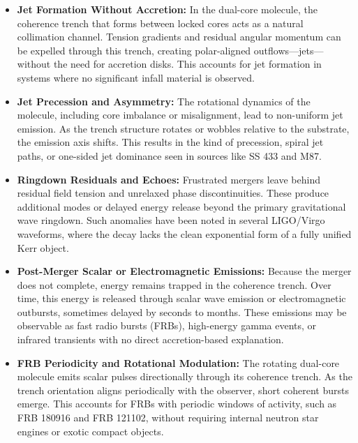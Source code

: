 \documentclass[sn-mathphys]{sn-jnl}
\theoremstyle{thmstyleone}%
\theoremstyle{thmstyletwo}%
\theoremstyle{thmstylethree}%
\begin{document}
\begin{itemize}
\item \textbf{Jet Formation Without Accretion:}  
In the dual-core molecule, the coherence trench that forms between locked cores acts as a natural collimation channel. Tension gradients and residual angular momentum can be expelled through this trench, creating polar-aligned outflows—jets—without the need for accretion disks. This accounts for jet formation in systems where no significant infall material is observed.

\item \textbf{Jet Precession and Asymmetry:}  
The rotational dynamics of the molecule, including core imbalance or misalignment, lead to non-uniform jet emission. As the trench structure rotates or wobbles relative to the substrate, the emission axis shifts. This results in the kind of precession, spiral jet paths, or one-sided jet dominance seen in sources like SS 433 and M87.

\item \textbf{Ringdown Residuals and Echoes:}  
Frustrated mergers leave behind residual field tension and unrelaxed phase discontinuities. These produce additional modes or delayed energy release beyond the primary gravitational wave ringdown. Such anomalies have been noted in several LIGO/Virgo\cite{Abbott2020} waveforms, where the decay lacks the clean exponential form of a fully unified Kerr object.

\item \textbf{Post-Merger Scalar or Electromagnetic Emissions:}  
Because the merger does not complete, energy remains trapped in the coherence trench. Over time, this energy is released through scalar wave emission or electromagnetic outbursts, sometimes delayed by seconds to months. These emissions may be observable as fast radio bursts (FRBs), high-energy gamma events, or infrared transients with no direct accretion-based explanation.

\item \textbf{FRB Periodicity and Rotational Modulation:}  
The rotating dual-core molecule emits scalar pulses directionally through its coherence trench. As the trench orientation aligns periodically with the observer, short coherent bursts emerge. This accounts for FRBs with periodic windows of activity, such as FRB 180916 and FRB 121102, without requiring internal neutron star engines or exotic compact objects.



\end{itemize}
\end{document}
